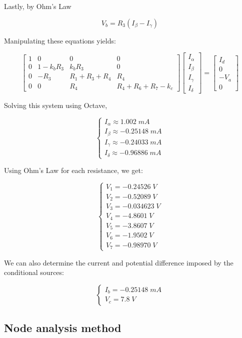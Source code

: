 Lastly, by Ohm's Law

\begin{equation}
  V_b = R_3 (I_\beta - I_\gamma)
\end{equation}

Manipulating these equations yields:

\begin{equation}
  \begin{bmatrix}
  1 & 0 & 0 & 0 \\
  0 & 1-k_b R_3 & k_b R_3 & 0 \\
  0 & -R_3 & R_1+R_3+R_4 & R_4 \\
  0 & 0 & R_4 & R_4+R_6+R_7-k_c
  \end{bmatrix}
  \begin{bmatrix}
  I_\alpha \\
  I_\beta \\
  I_\gamma \\
  I_\delta
  \end{bmatrix}
  =
  \begin{bmatrix}
  I_d \\
  0 \\
  -V_a \\
  0
  \end{bmatrix}
\end{equation}

Solving this system using Octave,

\begin{equation}
  \begin{cases}
    I_\alpha \approx 1.002\; mA \\
    I_\beta \approx -0.25148\; mA \\
    I_\gamma \approx -0.24033\; mA \\
    I_\delta \approx -0.96886\; mA
  \end{cases}
\end{equation}

Using Ohm's Law for each resistance, we get:

\begin{equation}
  \begin{cases}
    V_1 = -0.24526\; V \\
    V_2 = -0.52089\; V \\
    V_3 = -0.034623\; V \\
    V_4 = -4.8601\; V \\
    V_5 = -3.8607\; V \\
    V_6 = -1.9502\; V \\
    V_7 = -0.98970\; V
  \end{cases}
\end{equation}

We can also determine the current and potential difference imposed by the conditional sources:

\begin{equation}
  \begin{cases}
    I_b = -0.25148\; mA \\
    V_c = 7.8\; V
  \end{cases}
\end{equation}
    

\subsection{Node analysis method}


\lipsum[1-1]


